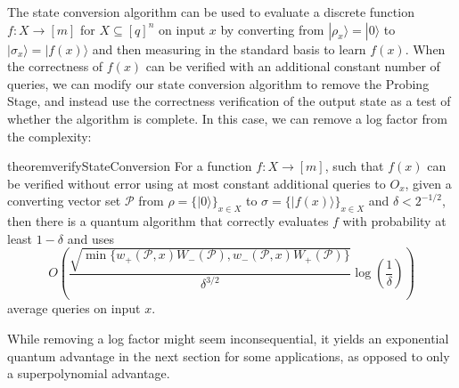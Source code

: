 \documentclass[cleveref, autoref, thm-restate,11pt]{article}
\theoremstyle{definition}
\newcommand{\ket}[1]{|#1\rangle}
\renewcommand{\wp}[2]{{w_+({#1},{#2})}}
\newcommand{\wm}[2]{{w_-({#1},{#2})}}
\begin{document}
The state conversion algorithm can be used to evaluate a discrete function $f:X\rightarrow [m]$ for $X\subseteq [q]^n$ on input $x$ by converting from $\ket{\rho_x}=\ket{0}$ to $\ket{\sigma_x}=\ket{f(x)}$ 
and then measuring in the standard basis to learn $f(x)$.
When the correctness of $f(x)$ can be verified with an additional constant number
of queries, we can modify our state conversion algorithm to remove the Probing Stage,
and instead use the correctness verification of the output state as a test of whether
the algorithm is complete. In this case, we can remove a log factor from 
the complexity:
\begin{restatable}{theorem}{verifyStateConversion}\label{thm:verify_state_conversion}
For a function $f:X\rightarrow [m]$, such that $f(x)$ can be verified without error
using at most constant additional queries to $O_x$, given a converting vector set $\mathscr P$
from $\rho=\{\ket{0}\}_{x\in X}$ to $\sigma=\{\ket{f(x)}\}_{x\in X}$ and $\delta<2^{-1/2}$, then there is a quantum algorithm
that correctly evaluates $f$ with probability at least $1-\delta$
and uses
\begin{equation}
O\left(\frac{\sqrt{\min\{\wp{\mathscr P}{x}W_-(\mathscr P),\wm{\mathscr P}{x}W_+(\mathscr P)\}}}{\delta^{3/2}}\log\left(\frac{1}{\delta}\right)\right)
\end{equation}
average queries on input $x.$
\end{restatable}



While removing a log factor might seem inconsequential, it yields
an exponential quantum advantage in the next section for some applications, as opposed to only
a superpolynomial advantage. 
\end{document}
